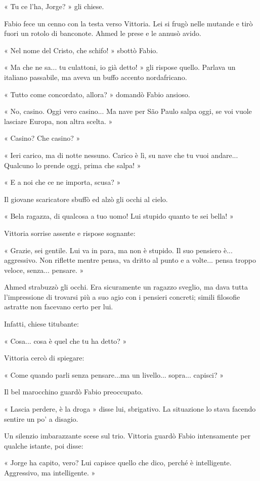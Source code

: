 « Tu ce l'ha, Jorge? » gli chiese.

Fabio fece un cenno con la testa verso Vittoria. Lei si frugò nelle mutande e tirò fuori un rotolo di banconote. Ahmed le prese e le annusò avido.

« Nel nome del Cristo, che schifo! » sbottò Fabio.

« Ma che ne sa... tu culattoni, io già detto! » gli rispose quello. Parlava un italiano passabile, ma aveva un buffo accento nordafricano.

« Tutto come concordato, allora? » domandò Fabio ansioso.

« No, casino. Oggi vero casino... Ma nave per São Paulo salpa oggi, se voi vuole lasciare Europa, non altra scelta. »

« Casino? Che casino? »

« Ieri carico, ma di notte nessuno. Carico è lì, su nave che tu vuoi andare... Qualcuno lo prende oggi, prima che salpa! »

« E a noi che ce ne importa, scusa? »

Il giovane scaricatore sbuffò ed alzò gli occhi al cielo.

« Bela ragazza, di qualcosa a tuo uomo! Lui stupido quanto te sei bella! »

Vittoria sorrise assente e rispose sognante:

« Grazie, sei gentile. Lui va in para, ma non è stupido. Il suo pensiero è... aggressivo. Non riflette mentre pensa, va dritto al punto e a volte... pensa troppo veloce, senza... pensare. »

Ahmed strabuzzò gli occhi. Era sicuramente un ragazzo sveglio, ma dava tutta l'impressione di trovarsi più a suo agio con i pensieri concreti; simili filosofie astratte non facevano certo per lui.

Infatti, chiese titubante:

« Cosa... cosa è quel che tu ha detto? »

Vittoria cercò di spiegare:

« Come quando parli senza pensare...ma un livello... sopra... capisci? »

Il bel marocchino guardò Fabio preoccupato.

« Lascia perdere, è la droga » disse lui, sbrigativo. La situazione lo stava facendo sentire un po' a disagio.

Un silenzio imbarazzante scese sul trio. Vittoria guardò Fabio intensamente per qualche istante, poi disse:

« Jorge ha capito, vero? Lui capisce quello che dico, perché è intelligente. Aggressivo, ma intelligente. »

